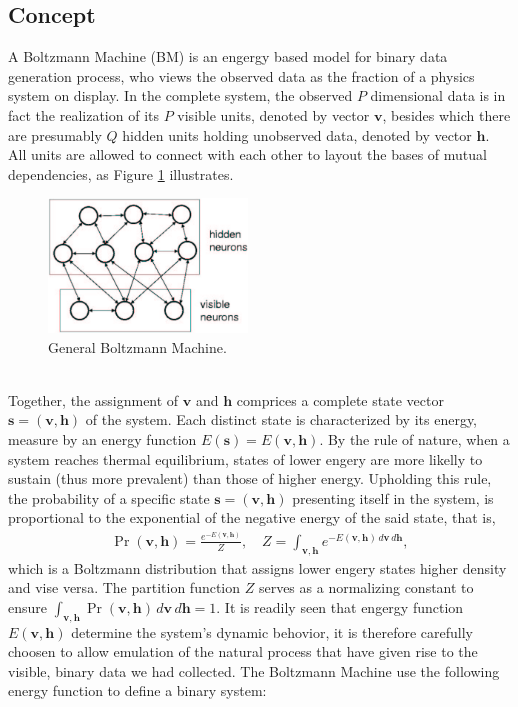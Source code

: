 \documentclass[11pt]{article}
\newcommand{\vh}{\boldsymbol{h}}
\newcommand{\vv}{\boldsymbol{v}}
\newcommand{\vs}{\boldsymbol{s}}
\begin{document}
\subsection{Concept}
A Boltzmann Machine (BM) is an engergy based model for binary data generation process, who views the observed data as the fraction of a physics system on display. In the complete system, the observed $P$ dimensional data is in fact the realization of its $P$ visible units, denoted by vector $\vv$, besides which there are presumably $Q$ hidden units holding unobserved data, denoted by vector $\vh$. All units are allowed to connect with each other to layout the bases of mutual dependencies, as Figure \ref{fig:gbm} illustrates.
\begin{figure}[h]
  \centering
  \includegraphics[width=200px]{img/gbm.png}
  \caption{General Boltzmann Machine.}\label{fig:gbm}
\end{figure} \\
Together, the assignment of $\vv$ and $\vh$ comprices a complete state vector $\vs =(\vv, \vh)$ of the system. Each distinct state is characterized by its energy, measure by an energy function $E(\vs) = E(\vv, \vh)$. By the rule of nature, when a system reaches thermal equilibrium, states of lower engery are more likelly to sustain (thus more prevalent) than those of higher energy. Upholding this rule, the probability of a specific state $\vs=(\vv, \vh)$ presenting itself in the system, is proportional to the exponential of the negative energy of the said state, that is,
\begin{equation} \label{eq:p(s)}  %
  \begin{split}
    \Pr(\vv, \vh) = \frac{e^{-E(\vv, \vh)}}{Z}, \quad Z = \int_{\vv,\vh} e^{-E(\vv, \vh) \,d\vv\,d\vh},
  \end{split}
\end{equation}
which is a Boltzmann distribution that assigns lower engery states higher density and vise versa. The partition function $Z$ serves as a normalizing constant to ensure $\int_{\vv, \vh} \Pr(\vv, \vh) \,d\vv\,d\vh = 1$. It is readily seen that engergy function $E(\vv, \vh)$ determine the system's dynamic behovior, it is therefore carefully choosen to allow emulation of the natural process that have given rise to the visible, binary data we had collected. The Boltzmann Machine use the following energy function to define a binary system:
\end{document}
